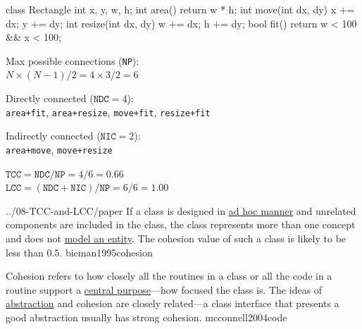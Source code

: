 \documentclass{article}
\begin{document}
\begin{multicols}{2}
{\small\begin{ffcode}
class Rectangle
  int x, y, w, h;
  int area()
    return w * h;
  int move(int dx, dy)
    x += dx; y += dy;
  int resize(int dx, dy)
    w += dx; h += dy;
  bool fit()
    return w < 100
      && x < 100;
\end{ffcode}
}
\par\columnbreak\par
Max possible connections (\texttt{NP}): \\
\( N \times (N-1) / 2 = 4 \times 3 / 2 = 6\)
\par
Directly connected (\(\texttt{NDC}=4\)): \\
\texttt{area+fit}, \texttt{area+resize}, \texttt{move+fit}, \texttt{resize+fit}
\par
Indirectly connected (\(\texttt{NIC}=2\)): \\
\texttt{area+move}, \texttt{move+resize}
\par
\(\texttt{TCC} = \texttt{NDC} / \texttt{NP} = 4/6 = 0.66 \) \\
\(\texttt{LCC} = (\texttt{NDC} + \texttt{NIC}) / \texttt{NP} = 6/6 = 1.00 \) \\
\end{multicols}
\plush{}

\lnQuote
  {../08-TCC-and-LCC/paper}
  {If a class is designed in \ul{ad hoc manner} and unrelated components are included in the class, the class represents more than one concept and does not \ul{model an entity}. The cohesion value of such a class is likely to be less than 0.5.}
  {bieman1995cohesion}

  {Cohesion refers to how closely all the routines in a class or all the code in a routine support a \ul{central purpose}---how focused the class is. The ideas of \ul{abstraction} and cohesion are closely related---a class interface that presents a good abstraction usually has strong cohesion.}
  {mcconnell2004code}
\end{document}

